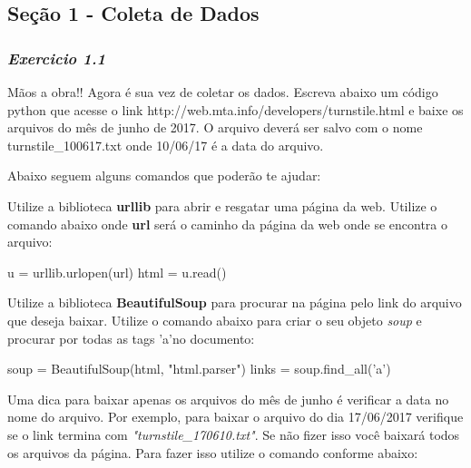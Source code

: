 \documentclass[11pt]{article}
\newenvironment{Shaded}{}{}
\newcommand{\StringTok}[1]{\textcolor[rgb]{0.25,0.44,0.63}{{#1}}}
\newcommand{\NormalTok}[1]{{#1}}
\newcommand{\OperatorTok}[1]{\textcolor[rgb]{0.40,0.40,0.40}{{#1}}}
\begin{document}
    \subsection{Seção 1 - Coleta de
Dados}\label{seuxe7uxe3o-1---coleta-de-dados}

\subsubsection{\texorpdfstring{\emph{Exercicio
1.1}}{Exercicio 1.1}}\label{exercicio-1.1}

Mãos a obra!! Agora é sua vez de coletar os dados. Escreva abaixo um
código python que acesse o link
http://web.mta.info/developers/turnstile.html e baixe os arquivos do mês
de junho de 2017. O arquivo deverá ser salvo com o nome
turnstile\_100617.txt onde 10/06/17 é a data do arquivo.

Abaixo seguem alguns comandos que poderão te ajudar:

Utilize a biblioteca \textbf{urllib} para abrir e resgatar uma página da
web. Utilize o comando abaixo onde \textbf{url} será o caminho da página
da web onde se encontra o arquivo:

\begin{Shaded}
\begin{Highlighting}[]
\NormalTok{u }\OperatorTok{=}\NormalTok{ urllib.urlopen(url)}
\NormalTok{html }\OperatorTok{=}\NormalTok{ u.read()}
\end{Highlighting}
\end{Shaded}

Utilize a biblioteca \textbf{BeautifulSoup} para procurar na página pelo
link do arquivo que deseja baixar. Utilize o comando abaixo para criar o
seu objeto \emph{soup} e procurar por todas as tags 'a'no documento:

\begin{Shaded}
\begin{Highlighting}[]
\NormalTok{soup }\OperatorTok{=}\NormalTok{ BeautifulSoup(html, }\StringTok{"html.parser"}\NormalTok{)}
\NormalTok{links }\OperatorTok{=}\NormalTok{ soup.find_all(}\StringTok{'a'}\NormalTok{)}
\end{Highlighting}
\end{Shaded}

Uma dica para baixar apenas os arquivos do mês de junho é verificar a
data no nome do arquivo. Por exemplo, para baixar o arquivo do dia
17/06/2017 verifique se o link termina com
\emph{"turnstile\_170610.txt"}. Se não fizer isso você baixará todos os
arquivos da página. Para fazer isso utilize o comando conforme abaixo:
\end{document}
